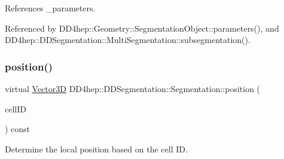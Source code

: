 References \+\_\+parameters.



Referenced by D\+D4hep\+::\+Geometry\+::\+Segmentation\+Object\+::parameters(), and D\+D4hep\+::\+D\+D\+Segmentation\+::\+Multi\+Segmentation\+::subsegmentation().

\hypertarget{class_d_d4hep_1_1_d_d_segmentation_1_1_segmentation_a594fe6d78667415855858d083b64acad}{}\label{class_d_d4hep_1_1_d_d_segmentation_1_1_segmentation_a594fe6d78667415855858d083b64acad} 
\subsubsection{\texorpdfstring{position()}{position()}}
{\footnotesize\ttfamily virtual \hyperlink{struct_d_d4hep_1_1_d_d_segmentation_1_1_vector3_d}{Vector3D} D\+D4hep\+::\+D\+D\+Segmentation\+::\+Segmentation\+::position (\begin{DoxyParamCaption}\item[{const \hyperlink{namespace_d_d4hep_1_1_d_d_segmentation_ac7af071d85cb48820914434a07e21ba1}{Cell\+ID} \&}]{cell\+ID }\end{DoxyParamCaption}) const\hspace{0.3cm}{\ttfamily [pure virtual]}}



Determine the local position based on the cell ID. 



